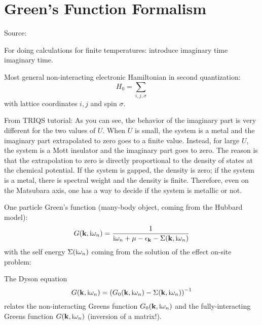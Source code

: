 \chapter{Green's Function Formalism}\label{ch:green's-function-formalism}

Source: \cite{Bruus_Flensberg_2004}



For doing calculations for finite temperatures: introduce imaginary time \gls{imaginary time}.

Most general non-interacting electronic Hamiltonian in second quantization:
\begin{equation}
    H_0 = \sum_{i, j, \sigma}
\end{equation}
with lattice coordinates \(i, j\) and spin \(\sigma\).


From TRIQS tutorial:
As you can see, the behavior of the imaginary part is very different for the two values of $U$. When
$U$ is small, the system is a metal and the imaginary part extrapolated to zero goes to a finite value.
Instead, for large $U$, the system is a Mott insulator and the imaginary part goes to zero. The reason
is that the extrapolation to zero is directly proportional to the density of states at the chemical
potential. If the system is gapped, the density is zero; if the system is a metal, there is spectral
weight and the density is finite. Therefore, even on the Matsubara axis, one has a way to decide if the
system is metallic or not. 

One particle Green's function (many-body object, coming from the Hubbard model):
\begin{equation}
    G(\bm{\mathrm{k}}, \mathrm{i} \omega_n) = \frac{1}{\mathrm{i} \omega_n + \mu - \epsilon_{\bm{\mathrm{k}}} - \Sigma(\bm{\mathrm{k}}, \mathrm{i} \omega_n)}
\end{equation}
with the self energy \(\Sigma(\mathrm{i} \omega_n)\) coming from the solution of the effect on-site problem:

The Dyson equation
\begin{equation}
    G(\bm{\mathrm{k}}, \mathrm{i} \omega_n) = \left( G_0 (\bm{\mathrm{k}}, \mathrm{i} \omega_n) - \Sigma(\bm{\mathrm{k}}, \mathrm{i} \omega_n)\right)^{-1}
\end{equation}
relates the non-interacting Greens function \(G_0 (\bm{\mathrm{k}}, \mathrm{i} \omega_n)\) and the fully-interacting Greens function \(G (\bm{\mathrm{k}}, \mathrm{i} \omega_n)\) (inversion of a matrix!).

